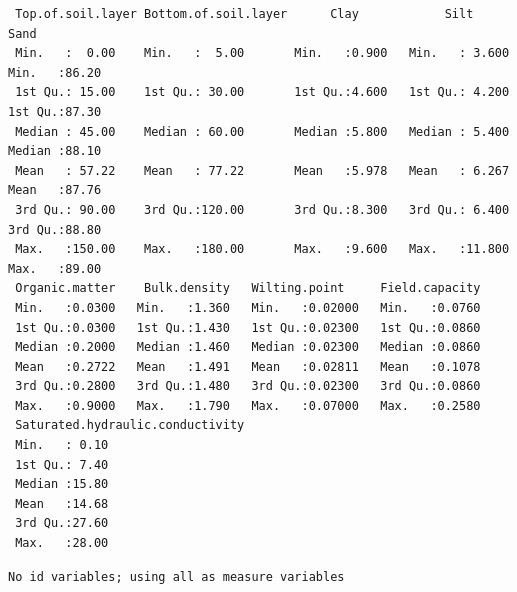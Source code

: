 \documentclass[
]{article}
\begin{document}
\begin{verbatim}
 Top.of.soil.layer Bottom.of.soil.layer      Clay            Silt             Sand      
 Min.   :  0.00    Min.   :  5.00       Min.   :0.900   Min.   : 3.600   Min.   :86.20  
 1st Qu.: 15.00    1st Qu.: 30.00       1st Qu.:4.600   1st Qu.: 4.200   1st Qu.:87.30  
 Median : 45.00    Median : 60.00       Median :5.800   Median : 5.400   Median :88.10  
 Mean   : 57.22    Mean   : 77.22       Mean   :5.978   Mean   : 6.267   Mean   :87.76  
 3rd Qu.: 90.00    3rd Qu.:120.00       3rd Qu.:8.300   3rd Qu.: 6.400   3rd Qu.:88.80  
 Max.   :150.00    Max.   :180.00       Max.   :9.600   Max.   :11.800   Max.   :89.00  
 Organic.matter    Bulk.density   Wilting.point     Field.capacity  
 Min.   :0.0300   Min.   :1.360   Min.   :0.02000   Min.   :0.0760  
 1st Qu.:0.0300   1st Qu.:1.430   1st Qu.:0.02300   1st Qu.:0.0860  
 Median :0.2000   Median :1.460   Median :0.02300   Median :0.0860  
 Mean   :0.2722   Mean   :1.491   Mean   :0.02811   Mean   :0.1078  
 3rd Qu.:0.2800   3rd Qu.:1.480   3rd Qu.:0.02300   3rd Qu.:0.0860  
 Max.   :0.9000   Max.   :1.790   Max.   :0.07000   Max.   :0.2580  
 Saturated.hydraulic.conductivity
 Min.   : 0.10                   
 1st Qu.: 7.40                   
 Median :15.80                   
 Mean   :14.68                   
 3rd Qu.:27.60                   
 Max.   :28.00                   
\end{verbatim}

\begin{verbatim}
No id variables; using all as measure variables
\end{verbatim}
\end{document}
